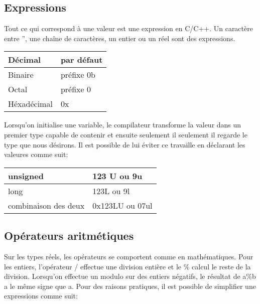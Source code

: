 \documentclass{article}
\begin{document}
\subsection{Expressions}
Tout ce qui correspond à une valeur est une expression en C/C++. Un caractère entre '', une chaîne de caractères, un entier ou un réel sont des expressions. 

\bigskip %
\begin{tabular}{|l|l|}  

\hline %
Décimal & par défaut  \\
\hline %
Binaire & préfixe 0b \\ 
\hline %
Octal & préfixe 0 \\ 
\hline %
Héxadécimal & 0x \\ 
\hline %

\end{tabular} 
\bigskip %

Lorsqu'on initialise une variable, le compilateur transforme la valeur dans un premier type capable de contenir et ensuite seulement il seulement il regarde le type que nous désirons. Il est possible de lui éviter ce travaille en déclarant les valeures comme suit:

\bigskip %
\begin{tabular}{|l|l|}  

\hline %
unsigned & 123 U ou 9u \\
\hline %
long & 123L ou 9l \\ 
\hline %
combinaison des deux & 0x123LU ou 07ul \\ 
\hline %

\end{tabular} 
\bigskip %

\subsection{Opérateurs aritmétiques}
Sur les types réels, les opérateurs se comportent comme en mathématiques. Pour les entiers, l'opérateur / effectue une division entière et le \% calcul le reste de la division. Lorsqu'on effectue un modulo sur des entiers négatifs, le résultat de a\%b a le même signe que a. Pour des raisons pratiques, il est possible de simplifier une expressions comme suit:
\end{document}
